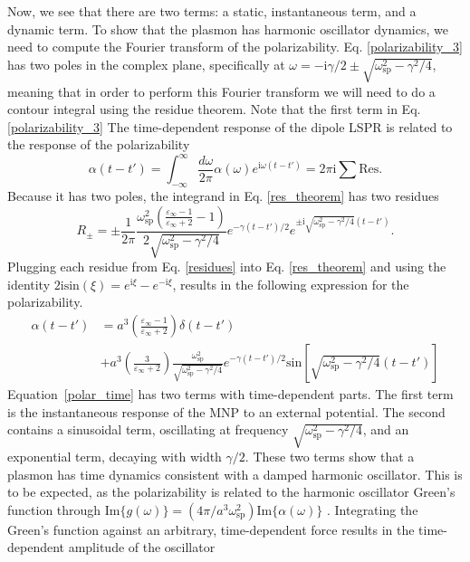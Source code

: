 \documentclass [11pt, proquest] {uwthesis}[2016/11/22]
\begin{document}
Now, we see that there are two terms: a static, instantaneous term, and a dynamic term. To show that the plasmon has harmonic oscillator dynamics, we need to compute the Fourier transform of the polarizability. Eq. \ref{polarizability_3} has two poles in the complex plane, specifically at $\omega = -\textrm{i}\gamma/2 \pm \sqrt{\omega_\textrm{sp}^2-\gamma^2/4}$, meaning that in order to perform this Fourier transform we will need to do a contour integral using the residue theorem. Note that the first term in Eq. \ref{polarizability_3}  The time-dependent response of the dipole LSPR is related to the response of the polarizability \cite{ARPC,Quillin}
\begin{equation}
\alpha(t-t') = \int_{-\infty}^{\infty}\frac{d\omega}{2\pi}\alpha(\omega)e^{\textrm{i}\omega (t-t')} = 2\pi\textrm{i}\sum\textrm{Res}.
\label{res_theorem}
\end{equation}
Because it has two poles, the integrand in Eq. \ref{res_theorem} has two residues
\begin{equation}
R_{\pm} = \pm\frac{1}{2\pi}\frac{\omega_{\textrm{sp}}^2\left(\frac{\varepsilon_{\infty}-1}{\varepsilon_{\infty}+2}-1\right)}{2\sqrt{\omega_\textrm{sp}^2-\gamma^2/4}}e^{-\gamma (t-t')/2}e^{\pm\textrm{i}\sqrt{\omega_\textrm{sp}^2-\gamma^2/4}(t-t')}.
\label{residues}
\end{equation}
Plugging each residue from Eq. \ref{residues} into Eq. \ref{res_theorem} and using the identity $2\textrm{i}\textrm{sin}(\xi) = e^{\textrm{i}\xi} - e^{-\textrm{i}\xi}$, results in the following expression for the polarizability.
\begin{equation}
\begin{aligned}
\alpha(t-t') &= a^3\left(\frac{\varepsilon_{\infty}-1}{\varepsilon_{\infty}+2}\right)\delta(t-t')\\
 & + a^3\left(\frac{3}{\varepsilon_{\infty}+2}\right)\frac{\omega_{\textrm{sp}}^2}{\sqrt{\omega_\textrm{sp}^2-\gamma^2/4}}e^{-\gamma (t-t')/2}\textrm{sin}\left[\sqrt{\omega_{\textrm{sp}}^2-\gamma^2/4}(t-t')\right]
\label{polar_time}
\end{aligned}
\end{equation}
Equation~\ref{polar_time} has two terms with time-dependent parts. The first term is the instantaneous response of the MNP to an external potential. The second contains a sinusoidal term, oscillating at frequency $\sqrt{\omega_\textrm{sp}^2-\gamma^2/4}$, and an exponential term, decaying with width $\gamma/2$. These two terms show that a plasmon has time dynamics consistent with a damped harmonic oscillator. This is to be expected, as the polarizability is related to the harmonic oscillator Green's function through $\textrm{Im}\{g(\omega)\} = (4\pi/a^3\omega_{\textrm{sp}}^2)\textrm{Im}\{\alpha(\omega)\}$ \cite{ARPC,Quillin}. Integrating the Green's function against an arbitrary, time-dependent force results in the time-dependent amplitude of the oscillator
\end{document}
